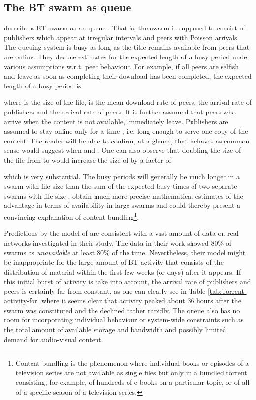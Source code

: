 \documentclass[12pt,english]{apa6}
\begin{document}
\subsection{The BT swarm as  queue}

\citet{menasche_content_2009} describe a BT swarm as an 
queue \citep{browne_transient_1993}. That is, the swarm is supposed
to consist of publishers which appear at irregular intervals and peers
with Poisson arrivals. The queuing system is busy as long as the title
remains available from peers that are online. They deduce estimates
for the expected length of a busy period under various assumptions
w.r.t. peer behaviour. For example, if all peers are selfish and leave
as soon as completing their download has been completed, the expected
length of a busy period is

where  is the size of the file,  is the mean download rate
of peers,  the arrival rate of publishers and  the arrival
rate of peers. It is further assumed that peers who arrive when the
content is not available, immediately leave. Publishers are assumed
to stay online only for a time , i.e. long enough
to serve one copy of the content. The reader will be able to confirm,
at a glance, that  behaves as common sense would suggest when
 and . One can also
observe that doubling the size of the file from  to  would
increase the size of  by a factor of

which is very substantial. The busy periods will generally be much
longer in a swarm with file size  than the sum of the expected
busy times of two separate swarms with file size . \citet{menasche_content_2009}
obtain much more precise mathematical estimates of the advantage in
terms of availability in large swarms and could thereby present a
convincing explanation of content bundling\footnote{Content bundling is the phenomenon where individual books or episodes
of a television series are not available as single files but only
in a bundled torrent consisting, for example, of hundreds of e-books
on a particular topic, or of all of a specific season of a television
series.}.

Predictions by the model of \citet{menasche_content_2009} are consistent
with a vast amount of data on real networks investigated in their
study. The data in their work showed 80\% of swarms as \emph{unavailable}
at least 80\% of the time. Nevertheless, their model might be inappropriate
for the large amount of BT activity that consists of the distribution
of material within the first few weeks (or days) after it appears.
If this initial burst of activity is take into account, the arrival
rate of publishers and peers is certainly far from constant, as one
can clearly see in Table \ref{tab:Torrent-activity-for} where it
seems clear that activity peaked about 36 hours after the swarm was
constituted and the declined rather rapidly. The  queue
also has no room for incorporating individual behaviour or system-wide
constraints such as the total amount of available storage and bandwidth
and possibly limited demand for audio-visual content.
\end{document}
